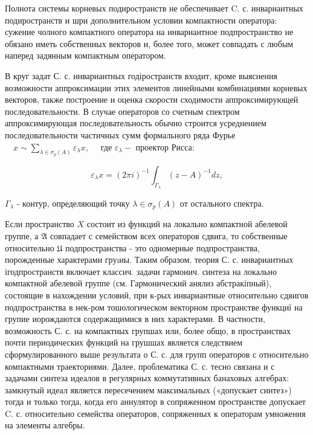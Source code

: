 \documentclass[10pt]{article}
\begin{document}
Полнота системы корневых подиространств не обеспечивает C. с. инвариантных подиространств и шри дополнительном условии компактности оператора: сужение чолного компактного оператора на инвариантное подпространство не обязано иметь собствениых векторов и, более того, может совпадать с любым наперед задянным компактным оператором.



В круг задат С. с. инвариантных годіространств входит, кроме выяснения возможности аппроксимации этих элементов линейными комбинациями корневых векторов, также построение и оценка скорости сходимости аппроксимирующей последовательности. В случае операторов со счетным спектром аппроксимирующая последовательность обычно строится усреднением последовательности частичных сумм формального ряда Фурье $\quad x \sim \sum_{\lambda \in \sigma_{p}(A)} \varepsilon_{\lambda} x, \quad$ где $\varepsilon_{\lambda}-$ проектор Рисса:



\[

\varepsilon_{\lambda} x=(2 \pi i)^{-1} \int_{\Gamma_{\lambda}}(z-A)^{-1} d z,

\]



$\Gamma_{\lambda}$ - контур, определяющий точку $\lambda \in \sigma_{p}(A)$ от остального спектра.



Если пространство $X$ состоит из функций на локально компактной абелевой группе, а $\mathfrak{A}$ совпадает с семейством всех операторов сдвига, то собственные относительно $\mathfrak{U}$ подпространства - это одномерные подпространства, порожденные характерами груıиы. Таким образом, теория С. с. инвариантных ігодпространств включает классич. задачи гармонич. синтеза на локально компактной абелевой группе (см. Гармонический анялиз абстракіпный), состоящие в нахождении условий, при к-рых инвариантные относительно сдвигов подпространства в нек-ром тошологическом векторном пространстве функциї на групие иорождаются содержащимися в них характерами. В частности, возможность С. с. на компактных групшах или, более общо, в пространствах почти периодических функций на грушшах является следствием сформулированного выше результата о С. с. для групп операторов с относительно компактными траекториями. Далее, проблематика С. с. тесно связана и с задачами синтеза идеалов в регулярных коммутативных банаховых алгебрах: замкнутый идеал является пересечением максимальных («допускает синтез») тогда и только тогда, когда его аннулятор в сопряженном пространстве допускает C. с. относительно семейства операторов, сопряженных к операторам умножения на элементы алгебры.
\end{document}
